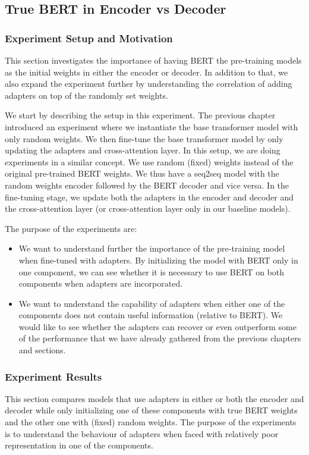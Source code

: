 \subsection{True BERT in Encoder vs Decoder}
\label{sec:pospre}
\subsubsection{Experiment Setup and Motivation}
This section investigates the importance of having BERT the pre-training models as the initial weights in either the encoder or decoder. In addition to that, we also expand the experiment further by understanding the correlation of adding adapters on top of the randomly set weights.

We start by describing the setup in this experiment. The previous chapter introduced an experiment where we instantiate the base transformer model with only random weights. We then fine-tune the base transformer model by only updating the adapters and cross-attention layer. In this setup, we are doing experiments in a similar concept. We use random (fixed) weights instead of the original pre-trained BERT weights. We thus have a seq2seq model with the random weights encoder followed by the BERT decoder and vice versa. In the fine-tuning stage, we update both the adapters in the encoder and decoder and the cross-attention layer (or cross-attention layer only in our baseline models).

The purpose of the experiments are:
\begin{itemize}
    \item We want to understand further the importance of the pre-training model when fine-tuned with adapters. By initializing the model with BERT only in one component, we can see whether it is necessary to use BERT on both components when adapters are incorporated.
    \item We want to understand the capability of adapters when either one of the components does not contain useful information (relative to BERT). We would like to see whether the adapters can recover or even outperform some of the performance that we have already gathered from the previous chapters and sections.
\end{itemize}

\subsubsection{Experiment Results}
This section compares models that use adapters in either or both the encoder and decoder while only initializing one of these components with true BERT weights and the other one with (fixed) random weights. The purpose of the experiments is to understand the behaviour of adapters when faced with relatively poor representation in one of the components.

